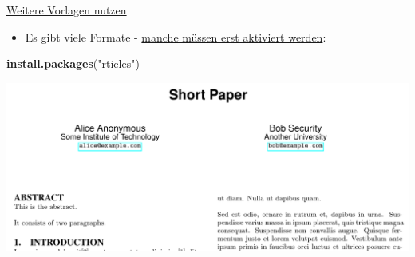 \documentclass[ignorenonframetext,]{beamer}
\newenvironment{Shaded}{}{}
\newcommand{\KeywordTok}[1]{\textcolor[rgb]{0.00,0.44,0.13}{\textbf{{#1}}}}
\newcommand{\StringTok}[1]{\textcolor[rgb]{0.25,0.44,0.63}{{#1}}}
\newcommand{\NormalTok}[1]{{#1}}
\providecommand{\tightlist}{%
\setlength{\itemsep}{0pt}\setlength{\parskip}{0pt}}
\begin{document}
\begin{frame}[fragile]{\href{http://rmarkdown.rstudio.com/developer_document_templates.html}{Weitere
Vorlagen nutzen}}

\begin{itemize}
\tightlist
\item
  Es gibt viele Formate -
  \href{https://blog.rstudio.org/2016/03/21/r-markdown-custom-formats/}{manche
  müssen erst aktiviert werden}:
\end{itemize}

\begin{Shaded}
\begin{Highlighting}[]
\KeywordTok{install.packages}\NormalTok{(}\StringTok{"rticles"}\NormalTok{)}
\end{Highlighting}
\end{Shaded}

\includegraphics{./tex2pdf.956/d23e4aaa5edff64d1017c3c578a456d45c480cdb.png}

\end{frame}
\end{document}

